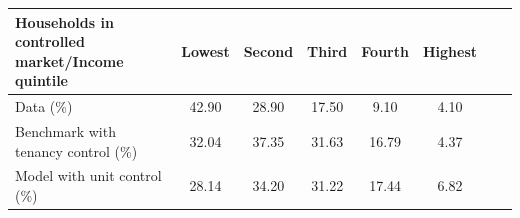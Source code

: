 \footnotesize
\renewcommand{\arraystretch}{1.2}
\begin{center}
\begin{tabular}{lccccccc}
\toprule
\textbf{Households in controlled market/Income quintile} & \textbf{Lowest} & \textbf{Second} & \textbf{Third} & \textbf{Fourth} & \textbf{Highest}\\ 
\midrule
Data (\%) & 42.90 & 28.90 & 17.50 &	9.10 & 4.10\\
Benchmark with tenancy control (\%) & 32.04	& 37.35	& 31.63 & 16.79 & 4.37 \\
Model with unit control (\%) & 28.14 & 34.20 & 31.22 & 17.44 & 6.82 \\
\bottomrule
\end{tabular}
\end{center}
\normalsize
